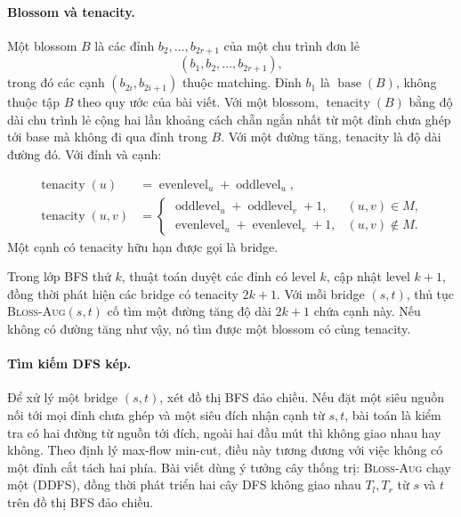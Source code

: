 \documentclass[11pt]{article}
\begin{document}
\paragraph{Blossom và tenacity.}
Một blossom \(B\) là các đỉnh \(b_2,\ldots,b_{2r+1}\) của một chu trình đơn lẻ
\[
  (b_1,b_2,\ldots,b_{2r+1}),
\]
trong đó các cạnh \((b_{2i},b_{2i+1})\) thuộc matching. Đỉnh \(b_1\) là
\(\operatorname{base}(B)\), không thuộc tập \(B\) theo quy ước của bài viết.
Với một blossom, \(\operatorname{tenacity}(B)\) bằng độ dài chu trình lẻ cộng
hai lần khoảng cách chẵn ngắn nhất từ một đỉnh chưa ghép tới base mà không đi
qua đỉnh trong \(B\). Với một đường tăng, tenacity là độ dài đường đó. Với
đỉnh và cạnh:



\[
\begin{aligned}
  \operatorname{tenacity}(u)
    &= \operatorname{evenlevel}_u+\operatorname{oddlevel}_u,\\
  \operatorname{tenacity}(u,v)
    &=
    \begin{cases}
      \operatorname{oddlevel}_u+\operatorname{oddlevel}_v+1,
      & (u,v)\in M,\\
      \operatorname{evenlevel}_u+\operatorname{evenlevel}_v+1,
      & (u,v)\notin M.
    \end{cases}
\end{aligned}
\]
Một cạnh có tenacity hữu hạn được gọi là bridge.

Trong lớp BFS thứ \(k\), thuật toán duyệt các đỉnh có level \(k\), cập nhật
level \(k+1\), đồng thời phát hiện các bridge có tenacity \(2k+1\). Với mỗi
bridge \((s,t)\), thủ tục \textsc{Bloss-Aug}\((s,t)\) cố tìm một đường tăng
độ dài \(2k+1\) chứa cạnh này. Nếu không có đường tăng như vậy, nó tìm được
một blossom có cùng tenacity.


\paragraph{Tìm kiếm DFS kép.}
Để xử lý một bridge \((s,t)\), xét đồ thị BFS đảo chiều. Nếu đặt một siêu
nguồn nối tới mọi đỉnh chưa ghép và một siêu đích nhận cạnh từ \(s,t\), bài
toán là kiểm tra có hai đường từ nguồn tới đích, ngoài hai đầu mút thì không
giao nhau hay không. Theo định lý max-flow min-cut, điều này tương đương với
việc không có một đỉnh cắt tách hai phía. Bài viết dùng ý tưởng cây thống trị:
\textsc{Bloss-Aug} chạy một  (DDFS), đồng thời
phát triển hai cây DFS không giao nhau \(T_l,T_r\) từ \(s\) và \(t\) trên đồ
thị BFS đảo chiều.
\end{document}
